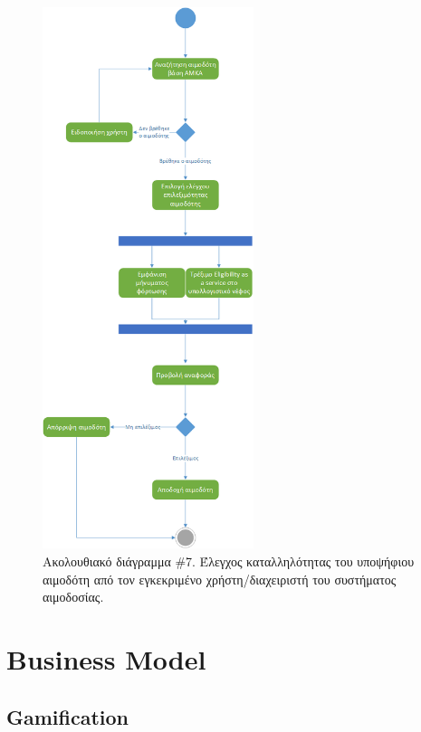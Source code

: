 	    \begin{figure}[H]
		    \centering
		    \includegraphics[width=0.55\textwidth]{EligibilityTest.png}
		    \caption{Ακολουθιακό διάγραμμα \#7. Έλεγχος καταλληλότητας του υποψήφιου αιμοδότη από τον  εγκεκριμένο χρήστη/διαχειριστή του συστήματος αιμοδοσίας.}
		    \label{fig:eligibiity}
		\end{figure}
		
\section{Business Model}
	\subsection{Gamification}
	
